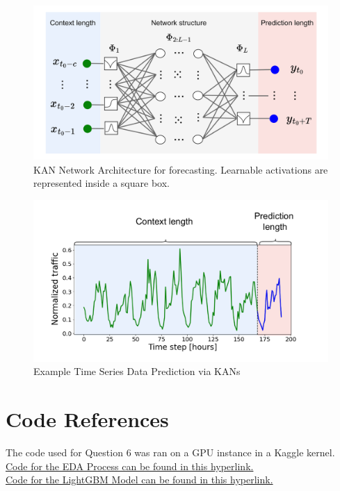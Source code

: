 \documentclass[12pt]{article}
\begin{document}
\begin{figure}[H]
    \centering
    \includegraphics[width=\textwidth]{Images/kantimeseries.png}
    \caption{KAN Network Architecture for forecasting. Learnable activations are represented inside a square box.}
    \label{fig:6-kannetwork}
\end{figure} 

\begin{figure}[H]
    \centering
    \includegraphics[width=\textwidth]{Images/kantimeseries2.png}
    \caption{Example Time Series Data Prediction via KANs}
    \label{fig:6-kanstimeseries}
\end{figure} 

\newpage

\section*{Code References}

The code used for Question 6 was ran on a GPU instance in a Kaggle kernel. \\

\noindent \href{https://www.kaggle.com/code/michaelhoon/eda-for-m5}{Code for the EDA Process can be found in this hyperlink.} \\ 

\noindent \href{https://github.com/cnicault/m5-forecasting-accuracy}{Code for the LightGBM Model can be found in this hyperlink.}




\end{document}
